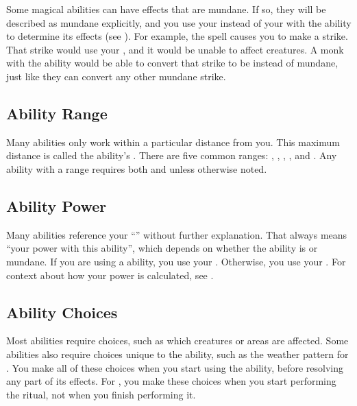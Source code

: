    Some magical abilities can have effects that are mundane.
    If so, they will be described as mundane explicitly, and you use your  instead of your  with the ability to determine its effects (see ).
    For example, the  spell causes you to make a  strike.
    That strike would use your , and it would be unable to affect  creatures.
    A monk with the  ability would be able to convert that strike to be \magical instead of mundane, just like they can convert any other mundane strike.

  \subsection{Ability Range}\label{Ability Range}
    Many abilities only work within a particular distance from you.
    This maximum distance is called the ability's .
    There are five common ranges: \shortrange, \medrange, \longrange, \distrange, and \extrange.
    Any ability with a range requires both  and  unless otherwise noted.

  \subsection{Ability Power}\label{Ability Power}
    Many abilities reference your ``'' without further explanation.
    That always means ``your power with this ability'', which depends on whether the ability is \magical or mundane.
    If you are using a \magical ability, you use your .
    Otherwise, you use your .
    For context about how your power is calculated, see .

  \subsection{Ability Choices}\label{Ability Choices}
    Most abilities require choices, such as which creatures or areas are affected.
    Some abilities also require choices unique to the ability, such as the weather pattern for .
    You make all of these choices when you start using the ability, before resolving any part of its effects.
    For , you make these choices when you start performing the ritual, not when you finish performing it.

